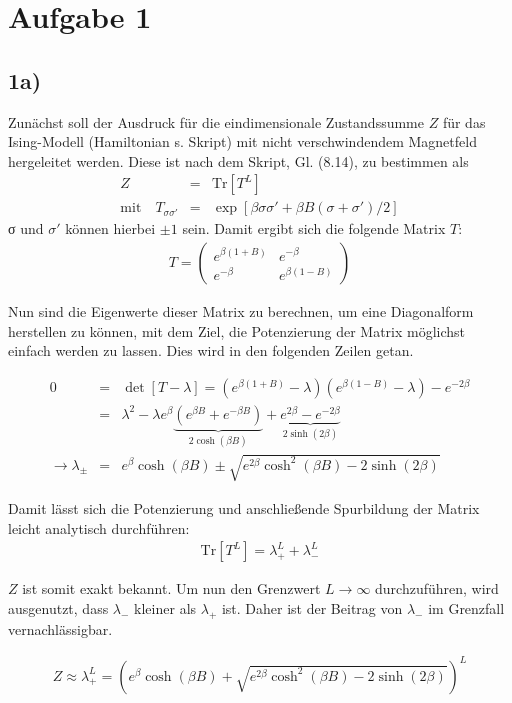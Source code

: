 \section*{Aufgabe 1}
\subsection*{1a)}
Zunächst soll der Ausdruck für die eindimensionale Zustandssumme $Z$ für das
Ising-Modell (Hamiltonian s. Skript) mit nicht verschwindendem Magnetfeld hergeleitet werden. Diese ist
nach dem Skript, Gl. (8.14), zu bestimmen als
\begin{eqnarray}
Z &=& \mathrm{Tr}\left[T^L\right]\\
\mathrm{mit\quad} T_{σσ'} &=& \exp[βσσ' + βB(σ+σ')/2]
\end{eqnarray}
σ und $σ'$ können hierbei $\pm 1$ sein. Damit ergibt sich die folgende Matrix $T$:
\begin{eqnarray}
T = \begin{pmatrix} e^{β(1+B)} & e^{-β} \\ e^{-β} & e^{β(1-B)} \end{pmatrix}
\end{eqnarray}

Nun sind die Eigenwerte dieser Matrix zu berechnen, um eine Diagonalform herstellen zu können,
mit dem Ziel, die Potenzierung der Matrix möglichst einfach werden zu lassen. Dies wird in den folgenden
Zeilen getan.

\begin{eqnarray}
0 &=& \det[T-λ] = (e^{β(1+B)}-λ)(e^{β(1-B)}-λ) - e^{-2β}\\
&=& λ^2 - λe^β\underbrace{\left(e^{βB} + e^{-βB}\right)}_{2\cosh(βB)} + \underbrace{e^{2β} - e^{-2β}}_{2\sinh(2β)}\\
→ λ_{\pm} &=& e^β\cosh(βB) \pm \sqrt{e^{2β}\cosh^2(βB) - 2\sinh(2β)}
\end{eqnarray}

Damit lässt sich die Potenzierung und anschließende Spurbildung der Matrix leicht
analytisch durchführen:
\begin{eqnarray}
\mathrm{Tr}[T^L] = λ_+^L + λ_-^L
\end{eqnarray}

$Z$ ist somit exakt bekannt. Um nun den Grenzwert $L→∞$ durchzuführen, wird ausgenutzt,
dass $λ_-$ kleiner als $λ_+$ ist. Daher ist der Beitrag von $λ_-$ im Grenzfall
vernachlässigbar.

\begin{eqnarray}
Z \approx λ_+^L = \left(e^β\cosh(βB) + \sqrt{e^{2β}\cosh^2(βB) - 2\sinh(2β)}\right)^L
\end{eqnarray}

